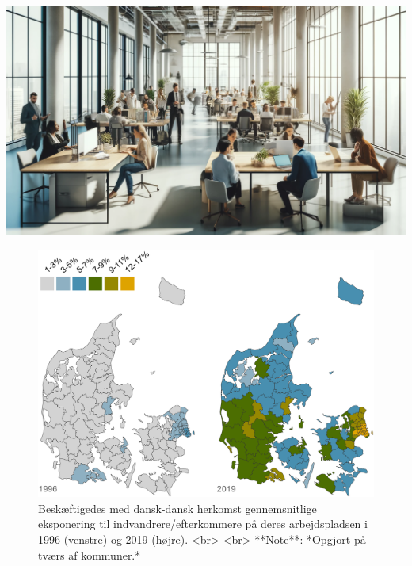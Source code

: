 \documentclass[
]{book}
\begin{document}
\includegraphics[width=1\linewidth]{images/dalle-work}

\begin{figure}
\includegraphics[width=1\linewidth]{images/Figur_4_1} \caption{Beskæftigedes med dansk-dansk herkomst gennemsnitlige eksponering til indvandrere/efterkommere på deres arbejdspladsen i 1996 (venstre) og 2019 (højre). <br> <br> **Note**: *Opgjort på tværs af kommuner.*}\label{fig:fig-4-1}
\end{figure}
\end{document}
